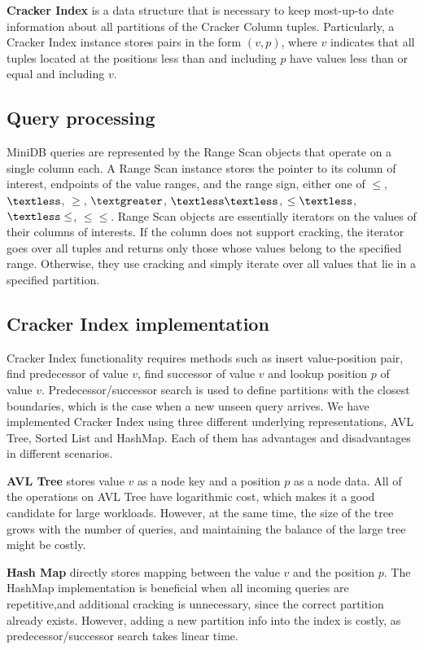 \textbf{Cracker Index} is a data structure that is necessary to keep most-up-to date information about all partitions of the Cracker Column tuples. Particularly, a Cracker Index instance stores pairs in the form $(v, p)$, where $v$ indicates that all tuples located at the positions less than and including $p$ have values less than or equal and including $v$.

\subsection{Query processing}
MiniDB queries are represented by the Range Scan objects that operate on a single column each. A Range Scan instance stores the pointer to its column of interest, endpoints of the value ranges, and the range sign, either one of $\leq$, $\textless$, $\geq$, $\textgreater$, $\textless \textless$, $\leq \textless$, $\textless \leq$, $\leq \leq$. Range Scan objects are essentially iterators on the values of their columns of interests. If the column does not support cracking, the iterator goes over all tuples and returns only those whose values belong to the specified range. Otherwise, they use cracking and simply iterate over all values that lie in a specified partition. 


\subsection{Cracker Index implementation}
Cracker Index functionality requires methods such as insert value-position pair, find predecessor of value $v$, find successor of value $v$ and lookup position $p$ of value $v$. Predecessor/successor search is used to define partitions with the closest boundaries, which is the case when a new unseen query arrives. We have implemented Cracker Index using three different underlying representations, AVL Tree, Sorted List and HashMap. Each of them has advantages and disadvantages in different scenarios.

\textbf{AVL Tree} stores value $v$ as a node key and a position $p$ as a node data. All of the operations on AVL Tree have logarithmic cost, which makes it a good candidate for large workloads. However, at the same time, the size of the tree grows with the number of queries, and maintaining the balance of the large tree might be costly.

\textbf{Hash Map} directly stores mapping between the value $v$ and the position $p$. The HashMap implementation is beneficial when all incoming queries are repetitive,and additional cracking is unnecessary, since the correct partition already exists. However, adding a new partition info into the index is costly, as predecessor/successor search takes linear time.

